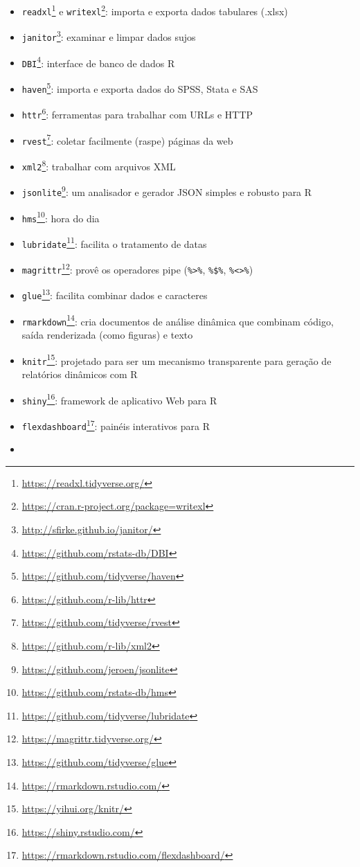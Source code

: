 \documentclass[
]{book}
\providecommand{\tightlist}{%
  \setlength{\itemsep}{0pt}\setlength{\parskip}{0pt}}
\renewcommand{\href}[2]{#2\footnote{\url{#1}}}
\begin{document}
\begin{itemize}
\tightlist
\item
  \href{https://readxl.tidyverse.org/}{\texttt{readxl}} e \href{https://cran.r-project.org/package=writexl}{\texttt{writexl}}: importa e exporta dados tabulares (.xlsx)
\item
  \href{http://sfirke.github.io/janitor/}{\texttt{janitor}}: examinar e limpar dados sujos
\item
  \href{https://github.com/rstats-db/DBI}{\texttt{DBI}}: interface de banco de dados R
\item
  \href{https://github.com/tidyverse/haven}{\texttt{haven}}: importa e exporta dados do SPSS, Stata e SAS
\item
  \href{https://github.com/r-lib/httr}{\texttt{httr}}: ferramentas para trabalhar com URLs e HTTP
\item
  \href{https://github.com/tidyverse/rvest}{\texttt{rvest}}: coletar facilmente (raspe) páginas da web
\item
  \href{https://github.com/r-lib/xml2}{\texttt{xml2}}: trabalhar com arquivos XML
\item
  \href{https://github.com/jeroen/jsonlite}{\texttt{jsonlite}}: um analisador e gerador JSON simples e robusto para R
\item
  \href{https://github.com/rstats-db/hms}{\texttt{hms}}: hora do dia
\item
  \href{https://github.com/tidyverse/lubridate}{\texttt{lubridate}}: facilita o tratamento de datas
\item
  \href{https://magrittr.tidyverse.org/}{\texttt{magrittr}}: provê os operadores pipe (\texttt{\%\textgreater{}\%}, \texttt{\%\$\%}, \texttt{\%\textless{}\textgreater{}\%})
\item
  \href{https://github.com/tidyverse/glue}{\texttt{glue}}: facilita combinar dados e caracteres
\item
  \href{https://rmarkdown.rstudio.com/}{\texttt{rmarkdown}}: cria documentos de análise dinâmica que combinam código, saída renderizada (como figuras) e texto
\item
  \href{https://yihui.org/knitr/}{\texttt{knitr}}: projetado para ser um mecanismo transparente para geração de relatórios dinâmicos com R
\item
  \href{https://shiny.rstudio.com/}{\texttt{shiny}}: framework de aplicativo Web para R
\item
  \href{https://rmarkdown.rstudio.com/flexdashboard/}{\texttt{flexdashboard}}: painéis interativos para R
\item

\end{itemize}
\end{document}
